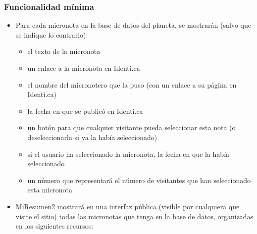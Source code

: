 \subsubsection{Funcionalidad mínima}

\begin{itemize}
\item Para cada micronota en la base de datos del planeta, se mostrarán (salvo que se indique lo contrario):
  \begin{itemize}
  \item el texto de la micronota
  \item un enlace a la micronota en Identi.ca
  \item el nombre del micronotero que la puso (con un enlace a su página en Identi.ca)
  \item la fecha en que se publicó en Identi.ca
  \item un botón para que cualquier visitante pueda seleccionar esta nota (o deseleccionarla si ya la había seleccionado)
  \item si el usuario ha seleccionado la micronota, la fecha en que la había seleccionado
  \item un número que representará el número de visitantes que han seleccionado esta micronota
  \end{itemize}

\item MiResumen2 mostrará en una interfaz pública (visible por cualquiera que visite el sitio) todas las micronotas que tenga en la base de datos, organizadas en los siguientes recursos:


\end{itemize}
